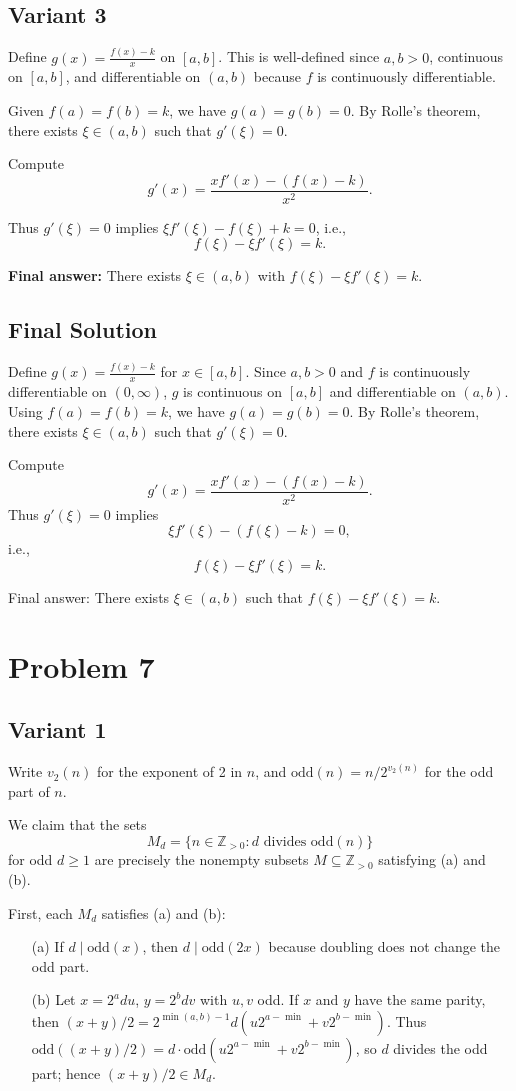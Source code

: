 \documentclass[12pt,a4paper]{article}
\theoremstyle{definition}
\begin{document}
    \subsection{Variant 3}
    Define $g(x) = \frac{f(x) - k}{x}$ on $[a,b]$. This is well-defined since $a,b > 0$, continuous on $[a,b]$, and differentiable on $(a,b)$ because $f$ is continuously differentiable.

    Given $f(a) = f(b) = k$, we have $g(a) = g(b) = 0$. By Rolle's theorem, there exists $\xi \in (a,b)$ such that $g'(\xi) = 0$.

    Compute
    \[g'(x) = \frac{x f'(x) - (f(x) - k)}{x^2}.\]

    Thus $g'(\xi) = 0$ implies $\xi f'(\xi) - f(\xi) + k = 0$, i.e.,
    \[f(\xi) - \xi f'(\xi) = k.\]

    \textbf{Final answer:} There exists $\xi \in (a,b)$ with $f(\xi) - \xi f'(\xi) = k$.
    \subsection{Final Solution}
    Define $g(x) = \frac{f(x) - k}{x}$ for $x \in [a,b]$. Since $a,b > 0$ and $f$ is continuously differentiable on $(0,\infty)$, $g$ is continuous on $[a,b]$ and differentiable on $(a,b)$. Using $f(a) = f(b) = k$, we have $g(a) = g(b) = 0$. By Rolle's theorem, there exists $\xi \in (a,b)$ such that $g'(\xi) = 0$.

    Compute
    $$g'(x) = \frac{x f'(x) - (f(x) - k)}{x^2}.$$
    Thus $g'(\xi) = 0$ implies
    $$\xi f'(\xi) - (f(\xi) - k) = 0,$$
    i.e.,
    $$f(\xi) - \xi f'(\xi) = k.$$

    Final answer: There exists $\xi \in (a,b)$ such that $f(\xi) - \xi f'(\xi) = k$.

    \section{Problem 7}
    \subsection{Variant 1}
    Write $v_2(n)$ for the exponent of 2 in $n$, and $\text{odd}(n) = n/2^{v_2(n)}$ for the odd part of $n$.

    We claim that the sets
    $$M_d = \{ n \in \mathbb{Z}_{>0} : d \text{ divides } \text{odd}(n) \}$$
    for odd $d \geq 1$ are precisely the nonempty subsets $M \subseteq \mathbb{Z}_{>0}$ satisfying (a) and (b).

    First, each $M_d$ satisfies (a) and (b):
    \begin{itemize}
        \item[(a)] If $d \mid \text{odd}(x)$, then $d \mid \text{odd}(2x)$ because doubling does not change the odd part.
        \item[(b)] Let $x = 2^a d u$, $y = 2^b d v$ with $u, v$ odd. If $x$ and $y$ have the same parity, then $(x+y)/2 = 2^{\min(a,b)-1} d (u 2^{a-\min} + v 2^{b-\min})$. Thus $\text{odd}((x+y)/2) = d \cdot \text{odd}(u 2^{a-\min} + v 2^{b-\min})$, so $d$ divides the odd part; hence $(x+y)/2 \in M_d$.
    \end{itemize}
\end{document}
